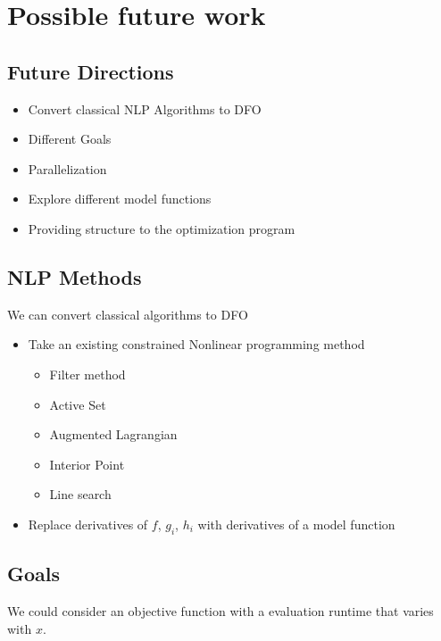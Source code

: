 \documentclass{article} %
\begin{document}
\section{Possible future work}

\subsection{Future Directions}

\begin{itemize}
\item Convert classical NLP Algorithms to DFO
\item Different Goals
\item Parallelization
\item Explore different model functions
\item Providing structure to the optimization program
\end{itemize}


\subsection{NLP Methods}

We can convert classical algorithms to DFO

\begin{itemize}
\item Take an existing constrained Nonlinear programming method
	\begin{itemize}
		\item Filter method
		\item Active Set
		\item Augmented Lagrangian
		\item Interior Point
		\item Line search
	\end{itemize}
\item Replace derivatives of $f$, $g_i$, $h_i$ with derivatives of a model function
\end{itemize}






\subsection{Goals}
We could consider an objective function with a evaluation runtime that varies with $x$.

\end{document}
